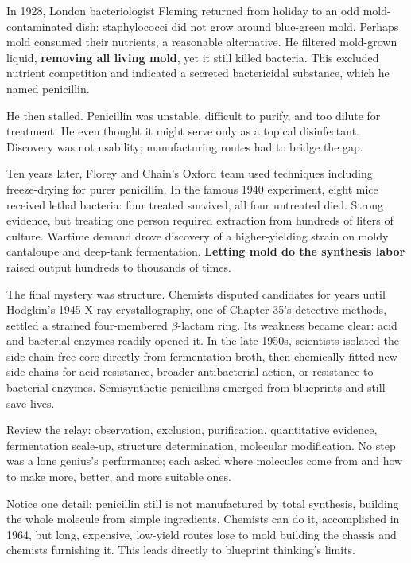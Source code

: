 \begin{zhengju}
In 1928, London bacteriologist Fleming returned from holiday to an odd mold-contaminated dish: staphylococci did not grow around blue-green mold. Perhaps mold consumed their nutrients, a reasonable alternative. He filtered mold-grown liquid, \textbf{removing all living mold}, yet it still killed bacteria. This excluded nutrient competition and indicated a secreted bactericidal substance, which he named penicillin.

He then stalled. Penicillin was unstable, difficult to purify, and too dilute for treatment. He even thought it might serve only as a topical disinfectant. Discovery was not usability; manufacturing routes had to bridge the gap.

Ten years later, Florey and Chain's Oxford team used techniques including freeze-drying for purer penicillin. In the famous 1940 experiment, eight mice received lethal bacteria: four treated survived, all four untreated died. Strong evidence, but treating one person required extraction from hundreds of liters of culture. Wartime demand drove discovery of a higher-yielding strain on moldy cantaloupe and deep-tank fermentation. \textbf{Letting mold do the synthesis labor} raised output hundreds to thousands of times.

The final mystery was structure. Chemists disputed candidates for years until Hodgkin's 1945 X-ray crystallography, one of Chapter 35's detective methods, settled a strained four-membered $\beta$-lactam ring. Its weakness became clear: acid and bacterial enzymes readily opened it. In the late 1950s, scientists isolated the side-chain-free core directly from fermentation broth, then chemically fitted new side chains for acid resistance, broader antibacterial action, or resistance to bacterial enzymes. Semisynthetic penicillins emerged from blueprints and still save lives.

Review the relay: observation, exclusion, purification, quantitative evidence, fermentation scale-up, structure determination, molecular modification. No step was a lone genius's performance; each asked where molecules come from and how to make more, better, and more suitable ones.
\end{zhengju}

Notice one detail: penicillin still is not manufactured by total synthesis, building the whole molecule from simple ingredients. Chemists can do it, accomplished in 1964, but long, expensive, low-yield routes lose to mold building the chassis and chemists furnishing it. This leads directly to blueprint thinking's limits.

